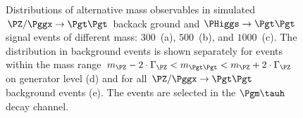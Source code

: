 {{{{{\begin{figure}
\begin{center}
\end{center}
\caption{
  Distributions of alternative mass observables in simulated $\PZ/\Pggx \to \Pgt\Pgt$ backack ground
  and $\PHiggs \to \Pgt\Pgt$ signal events of different mass:
  $300$~\GeV (a), $500$~\GeV (b), and $1000$~\GeV (c).
  The distribution in background events is shown separately for events within the
  mass range $m_{\PZ} - 2 \cdot \Gamma_{\PZ} < m_{\Pgt\Pgt} < m_{\PZ} + 2 \cdot \Gamma_{\PZ}$ on generator level (d)
  and for all $\PZ/\Pggx \to \Pgt\Pgt$ background events (e).
  The events are selected in the $\Pgm\tauh$ decay channel.
}
\label{fig:massDistributions_mssm_mutau}
\end{figure}

}}}}}
